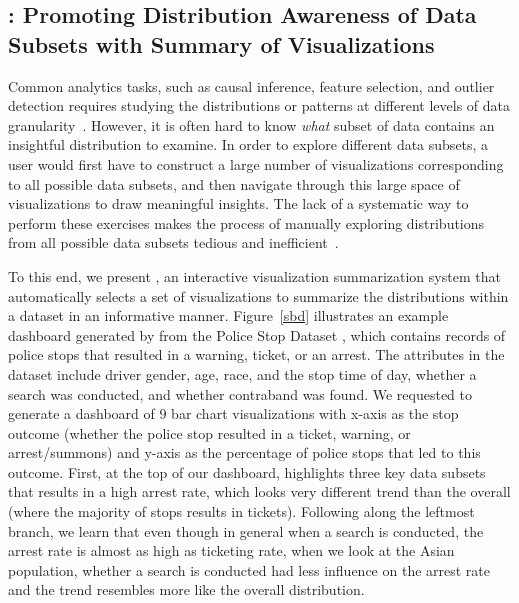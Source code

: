 \subsection{\sbd: Promoting Distribution Awareness of Data Subsets with Summary of Visualizations}
\par Common analytics tasks, such as causal inference, feature selection, and outlier detection requires studying the distributions or patterns at different levels of data granularity~\cite{Anand2015,Wu2013,Heer2012}. However, it is often hard to know \textit{what} subset of data contains an insightful distribution to examine. In order to explore different data subsets, a user would first have to construct a large number of visualizations corresponding to all possible data subsets, and then navigate through this large space of visualizations to draw meaningful insights. The lack of a systematic way to perform these exercises makes the process of manually exploring distributions from all possible data subsets tedious and inefficient~\cite{Sarawagi1998,Sarawagi2000}.
\par To this end, we present \sbd, an interactive visualization summarization system that automatically selects a set of visualizations to summarize the distributions within a dataset in an informative manner. Figure~\ref{sbd} illustrates an example dashboard generated by \sbd from the Police Stop Dataset \cite{police}, which contains records of police stops that resulted in a warning, ticket, or an arrest. The attributes in the dataset include driver gender, age, race, and the stop time of day, whether a search was conducted, and whether contraband was found. We requested \sbd to generate a dashboard of 9 bar chart visualizations with x-axis as the stop outcome (whether the police stop resulted in a ticket, warning, or arrest/summons) and y-axis as the percentage of police stops that led to this outcome. First, at the top of our dashboard, \sbd highlights three key data subsets that results in a high arrest rate, which looks very different trend than the overall (where the majority of stops results in tickets). Following along the leftmost branch, we learn that even though in general when a search is conducted, the arrest rate is almost as high as ticketing rate, when we look at the Asian population, whether a search is conducted had less influence on the arrest rate and the trend resembles more like the overall distribution.
